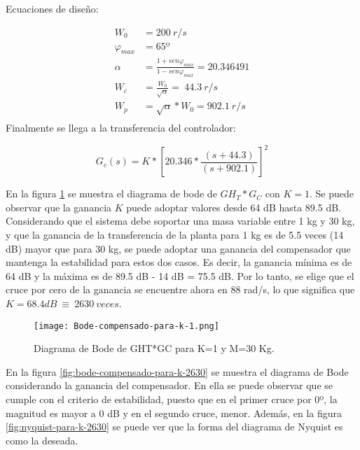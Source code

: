 \noindent Ecuaciones de dise\~{n}o:

\begin{equation}
	\begin{aligned}
		W_0 &=200\ r/s\\
		{\varphi }_{max} &=65\textrm{º}\\
		\alpha &=\frac{1+sen{\varphi }_{max}}{1-sen{\varphi }_{max}}=20.346491\\
		W_c &=\frac{W_0}{\sqrt{\alpha }}=\ 44.3\ r/s\\
		W_p &=\sqrt{\alpha }*W_0=902.1\ r/s\\
	\end{aligned}
\end{equation} 
\noindent Finalmente se llega a la transferencia del controlador:

 \begin{equation}  
 	G_c(s)=K*{[20.346*\frac{(s+44.3)}{(s+902.1)}]}^2
 \end{equation} 
 


\noindent En la figura \ref{fig:bode-compensado-para-k-1} se muestra el diagrama de bode de ${GH}_T*G_C$ con $K=1$. Se puede observar que la ganancia $K$ puede adoptar valores desde 64 dB hasta 89.5 dB. Considerando que el sistema debe soportar una masa variable entre 1 kg y 30 kg, y que la ganancia de la transferencia de la planta para 1 kg es de 5.5 veces (14 dB) mayor que para 30 kg, se puede adoptar una ganancia del compensador que mantenga la estabilidad para estos dos casos. Es decir, la ganancia m\'{i}nima es de 64 dB y la m\'{a}xima es de 89.5 dB - 14 dB = 75.5 dB. Por lo tanto, se elige que el cruce por cero de la ganancia se encuentre ahora en 88 rad/s, lo que significa que $K=68.4dB\ \equiv \ 2630\ veces$.


\begin{figure}[H]
	\centering
	\texttt{[image: Bode-compensado-para-k-1.png]}
	\caption{Diagrama de Bode de GHT*GC para K=1 y M=30 Kg.}
	\label{fig:bode-compensado-para-k-1}
\end{figure}


\noindent En la figura \ref{fig:bode-compensado-para-k-2630} se muestra el diagrama de Bode considerando la ganancia del compensador. En ella se puede observar que se  cumple con el criterio de estabilidad, puesto que en el primer cruce por 0º, la magnitud es mayor a 0 dB y en el segundo cruce, menor. Adem\'{a}s, en la figura \ref{fig:nyquist-para-k-2630} se puede ver que la forma del diagrama de Nyquist es como la deseada.

